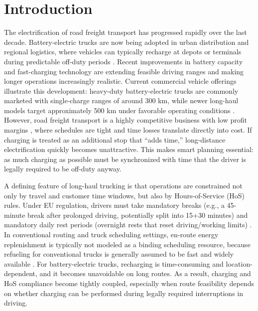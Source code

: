 \documentclass[3p,11pt,authoryear]{elsarticle}  %
\begin{document}


\section{Introduction}
\label{sec:Intro}

    The electrification of road freight transport has progressed rapidly over the last decade. Battery-electric trucks are now being adopted in urban distribution and regional logistics, where vehicles can typically recharge at depots or terminals during predictable off-duty periods \cite{shoman2023battery}. Recent improvements in battery capacity and fast-charging technology are extending feasible driving ranges and making longer operations increasingly realistic. Current commercial vehicle offerings illustrate this development: heavy-duty battery-electric trucks are commonly marketed with single-charge ranges of around 300 km, while newer long-haul models target approximately 500 km under favorable operating conditions \citep{volvofhElectric,mercedesEactros600}. However, road freight transport is a highly competitive business with low profit margins \citep{eu2025roadcharges}, where schedules are tight and time losses translate directly into cost. If charging is treated as an additional stop that “adds time,” long-distance electrification quickly becomes unattractive. This makes smart planning essential: as much charging as possible must be synchronized with time that the driver is legally required to be off-duty anyway.

    A defining feature of long-haul trucking is that operations are constrained not only by travel and customer time windows, but also by Hours-of-Service (HoS) rules. Under EU regulation, drivers must take mandatory breaks (e.g., a 45-minute break after prolonged driving, potentially split into 15+30 minutes) and mandatory daily rest periods (overnight rests that reset driving/working limits) \cite{goel2017exact}. In conventional routing and truck scheduling settings, en-route energy replenishment is typically not modeled as a binding scheduling resource, because refueling for conventional trucks is generally assumed to be fast and widely available \citep{schulz2024ipc}. For battery-electric trucks, recharging is time-consuming and location-dependent, and it becomes unavoidable on long routes. As a result, charging and HoS compliance become tightly coupled, especially when route feasibility depends on whether charging can be performed during legally required interruptions in driving.
\end{document}
